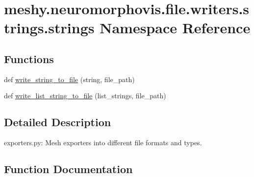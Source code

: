 \hypertarget{namespacemeshy_1_1neuromorphovis_1_1file_1_1writers_1_1strings_1_1strings}{}\section{meshy.\+neuromorphovis.\+file.\+writers.\+strings.\+strings Namespace Reference}
\label{namespacemeshy_1_1neuromorphovis_1_1file_1_1writers_1_1strings_1_1strings}
\subsection*{Functions}
\begin{DoxyCompactItemize}
\item 
def \hyperlink{namespacemeshy_1_1neuromorphovis_1_1file_1_1writers_1_1strings_1_1strings_acdfd7ac61e90b86023cce217554e4b6e}{write\+\_\+string\+\_\+to\+\_\+file} (string, file\+\_\+path)
\item 
def \hyperlink{namespacemeshy_1_1neuromorphovis_1_1file_1_1writers_1_1strings_1_1strings_a9193a7d41dc2a8d925b3261bf9984dc6}{write\+\_\+list\+\_\+string\+\_\+to\+\_\+file} (list\+\_\+strings, file\+\_\+path)
\end{DoxyCompactItemize}


\subsection{Detailed Description}
\begin{DoxyVerb}exporters.py:
    Mesh exporters into different file formats and types.
\end{DoxyVerb}
 

\subsection{Function Documentation}
